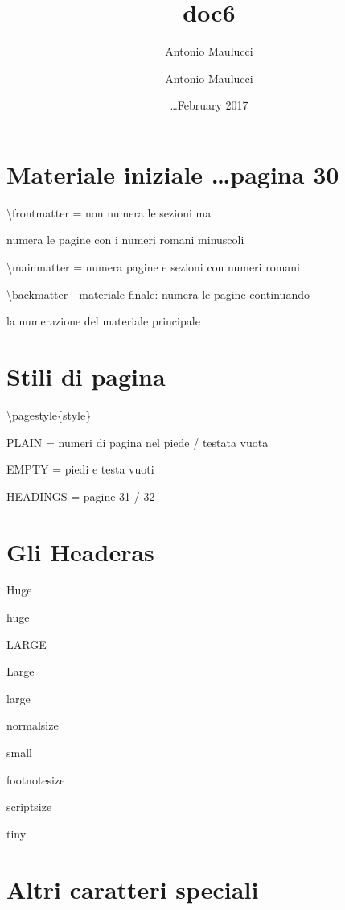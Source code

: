 \documentclass{article}
\title{doc6}
\author{Antonio Maulucci \and Antonio Maulucci}
\date{\dots February 2017}
\begin{document}
\maketitle



\section{Materiale iniziale \dots pagina 30}

\backslash frontmatter = non numera le sezioni ma

numera le pagine con i numeri romani minuscoli

\backslash mainmatter = numera pagine e sezioni con numeri romani

\backslash backmatter - materiale finale: numera le pagine continuando

la numerazione del materiale principale

\section{Stili di pagina}

\backslash pagestyle\{style\}

PLAIN = numeri di pagina nel piede / testata vuota

EMPTY = piedi e testa vuoti

HEADINGS = pagine 31 / 32

\section{Gli Headeras}

\Huge{Huge}

\huge{huge}

\LARGE{LARGE}

\Large{Large}

\large{large}

\normalsize{normalsize}

\small{small}

\footnotesize{footnotesize}

\scriptsize{scriptsize}

\tiny{tiny}

\normalsize %

\section{Altri caratteri speciali}
\end{document}
